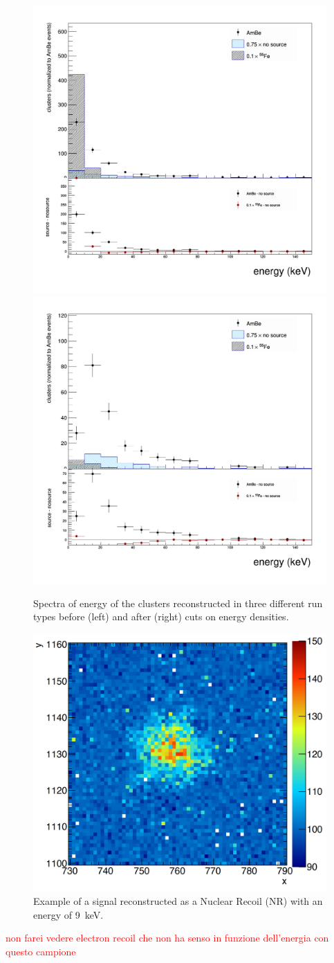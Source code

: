 \documentclass[12pt]{iopart}
\begin{document}
\begin{figure}[ht]
	\centering
	\includegraphics[width=0.45\linewidth]{energyExt.png}
	\includegraphics[width=0.45\linewidth]{energyExt_cut.png}
  	\caption{Spectra of energy of the clusters reconstructed in three different run types before (left) and after (right) cuts on energy densities.}
  	\label{fig:energy}
\end{figure}

\begin{figure}[ht]
	\centering
	\includegraphics[width=0.50\linewidth]{granchio.png}
  	\caption{Example of a signal reconstructed as a Nuclear Recoil (NR) with an energy of 9~keV.}
  	\label{fig:granchio}
\end{figure}

\textcolor{red}{non farei vedere electron recoil che non ha senso in funzione dell'energia con questo campione }



\end{document}
